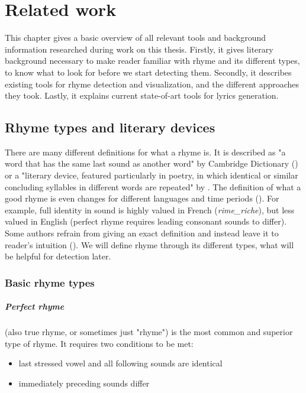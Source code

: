 \chapter{Related work}\label{chap-related-work}
This chapter gives a basic overview of all relevant tools and background information researched during work on this thesis. Firstly, it gives literary background necessary to make reader familiar with rhyme and its different types, to know what to look for before we start detecting them. Secondly, it describes existing tools for rhyme detection and visualization, and the different approaches they took. Lastly, it explains current state-of-art tools for lyrics generation.


\section{Rhyme types and literary devices}

There are many different definitions for what a rhyme is. It is described as "a word that has the same last sound as another word" by Cambridge Dictionary (\cite{walter2008cambridge}) or a "literary device, featured particularly in poetry, in which identical or similar concluding syllables in different words are repeated" by \cite{literarydevices2020}. The definition of what a good rhyme is even changes for different languages and time periods (\cite{zhirmunsky2013introduction}). For example, full identity in sound is highly valued in French (\textit{\gls{rime_riche}}), but less valued in English (perfect rhyme requires leading consonant sounds to differ). Some authors refrain from giving an exact definition and instead leave it to reader's intuition (\cite{plechavc2018collocation}). We will define rhyme through its different types, what will be helpful for detection later. 

\subsection{Basic rhyme types}
\paragraph{Perfect rhyme} (also true rhyme, or sometimes just "rhyme") is the most common and superior type of rhyme. It requires two conditions to be met:

\begin{itemize}
	\item last stressed vowel and all following sounds are identical
	\item immediately preceding sounds differ
\end{itemize}

